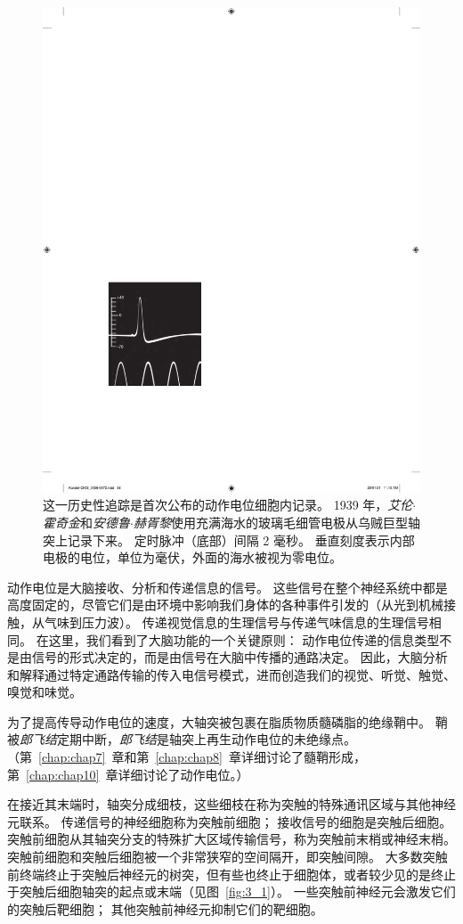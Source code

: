 \begin{figure}[htbp]
	\centering
	\includegraphics[width=0.5\linewidth]{chap03/fig_3_2}
	\caption{这一历史性追踪是首次公布的动作电位细胞内记录。 
		1939 年，\textit{艾伦$\cdot$霍奇金}和\textit{安德鲁$\cdot$赫胥黎}使用充满海水的玻璃毛细管电极从乌贼巨型轴突上记录下来。
		定时脉冲（底部）间隔 2 毫秒。 
		垂直刻度表示内部电极的电位，单位为毫伏，外面的海水被视为零电位\cite{hodgkin1939action}。}
	\label{fig:3_2}
\end{figure}


动作电位是大脑接收、分析和传递信息的信号。 
这些信号在整个神经系统中都是高度固定的，尽管它们是由环境中影响我们身体的各种事件引发的（从光到机械接触，从气味到压力波）。
传递视觉信息的生理信号与传递气味信息的生理信号相同。
在这里，我们看到了大脑功能的一个关键原则：
动作电位传递的信息类型不是由信号的形式决定的，而是由信号在大脑中传播的通路决定。
因此，大脑分析和解释通过特定通路传输的传入电信号模式，进而创造我们的视觉、听觉、触觉、嗅觉和味觉。


为了提高传导动作电位的速度，大轴突被包裹在脂质物质髓磷脂的绝缘鞘中。 
鞘被\textit{郎飞结}定期中断，\textit{郎飞结}是轴突上再生动作电位的未绝缘点。
（第~\ref{chap:chap7}~章和第~\ref{chap:chap8}~章详细讨论了髓鞘形成，第~\ref{chap:chap10}~章详细讨论了动作电位。）


在接近其末端时，轴突分成细枝，这些细枝在称为突触的特殊通讯区域与其他神经元联系。
传递信号的神经细胞称为突触前细胞；
接收信号的细胞是突触后细胞。
突触前细胞从其轴突分支的特殊扩大区域传输信号，称为突触前末梢或神经末梢。
突触前细胞和突触后细胞被一个非常狭窄的空间隔开，即突触间隙。
大多数突触前终端终止于突触后神经元的树突，但有些也终止于细胞体，或者较少见的是终止于突触后细胞轴突的起点或末端（见图~\ref{fig:3_1}）。 
一些突触前神经元会激发它们的突触后靶细胞；
其他突触前神经元抑制它们的靶细胞。


